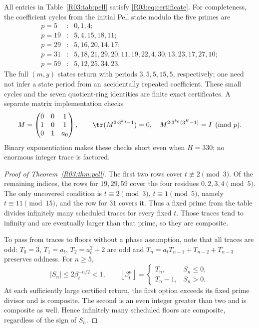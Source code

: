 \documentclass[11pt,a4paper]{article}
\theoremstyle{definition}\newtheorem{definition}[theorem]{Definition}
\theoremstyle{remark}\newtheorem{remark}[theorem]{Remark}
\newcommand{\floor}[1]{\left\lfloor#1\right\rfloor}
\begin{document}
All entries in Table~\ref{R03:tab:pell} satisfy \eqref{R03:eq:certificate}.
For completeness, the coefficient cycles from the initial Pell
state modulo the five primes are
\[
\begin{array}{rcl}
p=5&:&0,1,4;\\
p=19&:&5,4,15,18,11;\\
p=29&:&5,16,20,14,17;\\
p=31&:&5,18,21,29,20,11,19,22,4,30,13,23,17,27,10;\\
p=59&:&5,12,25,34,23.
\end{array}
\]
The full $(m,y)$ states return with periods $3,5,5,15,5$, respectively;
one need not infer a state period from an accidentally repeated
coefficient. These small cycles and the seven quotient-ring identities
are finite exact certificates. A separate matrix implementation checks
\begin{equation}\label{R03:eq:matrix-pell}
 M=\begin{pmatrix}0&0&1\\1&0&1\\0&1&a_0\end{pmatrix},\qquad
 \tr(M^{2\cdot3^{k_0}-1})=0,\quad
 M^{2\cdot3^{k_0}(3^H-1)}=I\pmod p.
\end{equation}
Binary exponentiation makes these checks short even when $H=330$;
no enormous integer trace is factored.

\begin{proof}[Proof of Theorem~\ref{R03:thm:pell}]
The first two rows cover $t\not\equiv2\pmod3$. Of the remaining
indices, the rows for $19,29,59$ cover the four residues
$0,2,3,4\pmod5$. The only uncovered condition is
$t\equiv2\pmod3$, $t\equiv1\pmod5$, namely $t\equiv11\pmod{15}$,
and the row for $31$ covers it. Thus a fixed prime from the table
divides infinitely many scheduled traces for every fixed $t$.
Those traces tend to infinity and are eventually larger than that
prime, so they are composite.

To pass from traces to floors without a phase assumption, note that
all traces are odd: $T_0=3$, $T_1=a_t$, $T_2=a_t^2+2$ are odd and
$T_n=a_tT_{n-1}+T_{n-2}+T_{n-3}$ preserves oddness. For $n\ge5$,
\[
 |S_n|\le2\beta_t^{-n/2}<1,\qquad
 \floor{\beta_t^n}=
 \begin{cases}T_n,&S_n\le0,\\T_n-1,&S_n>0.\end{cases}
\]
At each sufficiently large certified return, the first option exceeds
its fixed prime divisor and is composite. The second is an even
integer greater than two and is composite as well. Hence infinitely
many scheduled floors are composite, regardless of the sign of $S_n$.
\end{proof}
\end{document}
